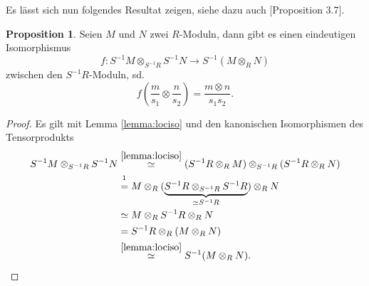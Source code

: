 \documentclass[11pt,titlepage]{article}
\theoremstyle{definition}
\newtheorem{proposition}[theorem]{Proposition}
\theoremstyle{remark}
\begin{document}
	Es lässt sich nun folgendes Resultat zeigen, siehe dazu auch \cite{introductiontocomalg}[Proposition 3.7].
	
	\begin{proposition}\label{prop:tensoriso}
		Seien $M$ und $N$ zwei $R$-Moduln, dann gibt es einen eindeutigen 
		Isomorphismus 
		\[f:S^{-1}M\otimes_{S^{-1}R}S^{-1}N\to S^{-1}(M\otimes_R N)\]
		zwischen den $S^{-1}R$-Moduln, sd.
		\[f\left(\frac{m}{s_1}\otimes\frac{n}{s_2}\right)=\frac{m\otimes n}{s_1s_2}.\]
	\end{proposition}

	\begin{proof}
		Es gilt mit Lemma \ref{lemma:lociso} und den kanonischen Isomorphismen des 
		Tensorprodukts
		\begin{align*}
			S^{-1}M\otimes_{S^{-1}R}S^{-1}N &\overset{\ref{lemma:lociso}}{\simeq}
			(S^{-1}R\otimes_R M)\otimes_{S^{-1}R}(S^{-1}R\otimes_R N) \\
			&\overset{\footnotemark}{=}
			 M\otimes_R (\underbrace{S^{-1}R\otimes_{S^{-1}R} S^{-1}R}_{\simeq S^{-1}R})\otimes_R N \\
			&\simeq M\otimes_R S^{-1}R \otimes_R N \\
			&= S^{-1}R \otimes_R(M\otimes_R N) \\
			&\overset{\ref{lemma:lociso}}{\simeq} S^{-1}(M\otimes_R N).
		\end{align*}
	\end{proof}

	
\end{document}

